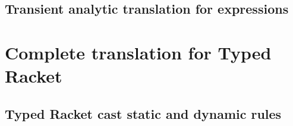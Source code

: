 \documentclass[a4paper,USenglish]{tex/lipics-v2016}
\begin{document}
\begin{mathpar}





\end{mathpar}

\subsection{Transient analytic translation for expressions}


\begin{mathpar}

\end{mathpar}

\section{Complete translation for Typed Racket}

\subsection{Typed Racket cast static and dynamic rules}
\end{document}
